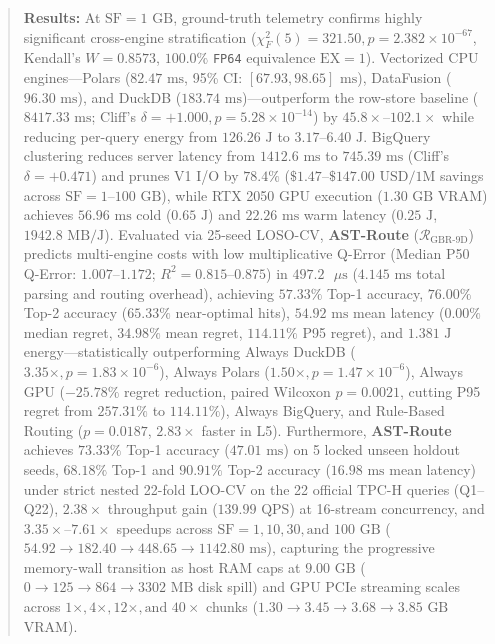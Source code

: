 \documentclass[10pt,a4paper]{article}
\begin{document}
\begin{quote}
\textbf{Results:} At $\text{SF}=1\text{ GB}$, ground-truth telemetry confirms highly significant cross-engine stratification ($\chi^2_F(5) = 321.50, p = 2.382 \times 10^{-67}$, Kendall's $W = 0.8573$, $100.0\%$ \texttt{FP64} equivalence $\text{EX}=1$). Vectorized CPU engines---Polars ($82.47\text{ ms}$, 95\% CI: $[67.93, 98.65]\text{ ms}$), DataFusion ($96.30\text{ ms}$), and DuckDB ($183.74\text{ ms}$)---outperform the row-store baseline ($8417.33\text{ ms}$; Cliff's $\delta = +1.000, p = 5.28 \times 10^{-14}$) by $45.8\times\text{--}102.1\times$ while reducing per-query energy from $126.26\text{ J}$ to $3.17\text{--}6.40\text{ J}$. BigQuery clustering reduces server latency from $1412.6\text{ ms}$ to $745.39\text{ ms}$ (Cliff's $\delta = +0.471$) and prunes V1 I/O by $78.4\%$ ($\$1.47\text{--}\$147.00\text{ USD/1M}$ savings across $\text{SF}=1\text{--}100\text{ GB}$), while RTX 2050 GPU execution ($1.30\text{ GB}$ VRAM) achieves $56.96\text{ ms}$ cold ($0.65\text{ J}$) and $22.26\text{ ms}$ warm latency ($0.25\text{ J}$, $1942.8\text{ MB/J}$). Evaluated via 25-seed LOSO-CV, \textbf{AST-Route} ($\mathcal{R}_{\text{GBR-9D}}$) predicts multi-engine costs with low multiplicative Q-Error (Median P50 Q-Error: $1.007\text{--}1.172$; $R^2 = 0.815\text{--}0.875$) in $497.2\text{ }\mu\text{s}$ ($4.145\text{ ms}$ total parsing and routing overhead), achieving $57.33\%$ Top-1 accuracy, $76.00\%$ Top-2 accuracy ($65.33\%$ near-optimal hits), $54.92\text{ ms}$ mean latency ($0.00\%$ median regret, $34.98\%$ mean regret, $114.11\%$ P95 regret), and $1.381\text{ J}$ energy---statistically outperforming Always DuckDB ($3.35\times, p=1.83\times 10^{-6}$), Always Polars ($1.50\times, p=1.47\times 10^{-6}$), Always GPU ($-25.78\%$ regret reduction, paired Wilcoxon $p=0.0021$, cutting P95 regret from $257.31\%$ to $114.11\%$), Always BigQuery, and Rule-Based Routing ($p = 0.0187$, $2.83\times$ faster in L5). Furthermore, \textbf{AST-Route} achieves $73.33\%$ Top-1 accuracy ($47.01\text{ ms}$) on 5 locked unseen holdout seeds, $68.18\%$ Top-1 and $90.91\%$ Top-2 accuracy ($16.98\text{ ms}$ mean latency) under strict nested 22-fold LOO-CV on the 22 official TPC-H queries (Q1--Q22), $2.38\times$ throughput gain ($139.99\text{ QPS}$) at 16-stream concurrency, and $3.35\times\text{--}7.61\times$ speedups across $\text{SF}=1, 10, 30, \text{and } 100\text{ GB}$ ($54.92 \rightarrow 182.40 \rightarrow 448.65 \rightarrow 1142.80\text{ ms}$), capturing the progressive memory-wall transition as host RAM caps at $9.00\text{ GB}$ ($0 \rightarrow 125 \rightarrow 864 \rightarrow 3302\text{ MB}$ disk spill) and GPU PCIe streaming scales across $1\times, 4\times, 12\times, \text{and } 40\times$ chunks ($1.30 \rightarrow 3.45 \rightarrow 3.68 \rightarrow 3.85\text{ GB}$ VRAM).\\[0.25em]

\end{quote}
\end{document}
